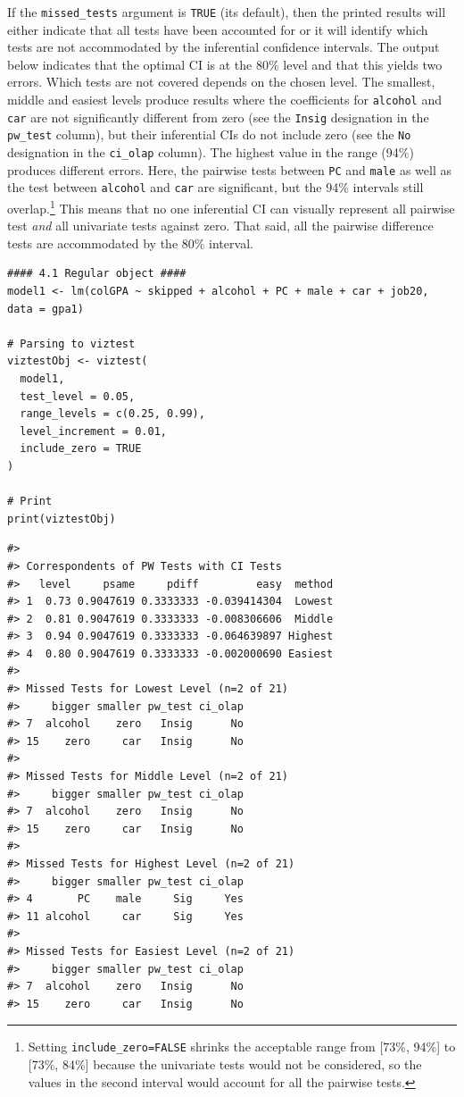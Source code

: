 If the \texttt{missed\_tests} argument is \texttt{TRUE} (its default), then the printed results will either indicate that all tests have been accounted for or it will identify which tests are not accommodated by the inferential confidence intervals. The output below indicates that the optimal CI is at the \(80\%\) level and that this yields two errors. Which tests are not covered depends on the chosen level. The smallest, middle and easiest levels produce results where the coefficients for \texttt{alcohol} and \texttt{car} are not significantly different from zero (see the \texttt{Insig} designation in the \texttt{pw\_test} column), but their inferential CIs do not include zero (see the \texttt{No} designation in the \texttt{ci\_olap} column). The highest value in the range (94\%) produces different errors. Here, the pairwise tests between \texttt{PC} and \texttt{male} as well as the test between \texttt{alcohol} and \texttt{car} are significant, but the 94\% intervals still overlap.\footnote{Setting \texttt{include\_zero=FALSE} shrinks the acceptable range from {[}73\%, 94\%{]} to {[}73\%, 84\%{]} because the univariate tests would not be considered, so the values in the second interval would account for all the pairwise tests.} This means that no one inferential CI can visually represent all pairwise test \emph{and} all univariate tests against zero. That said, all the pairwise difference tests are accommodated by the 80\% interval.

\begin{verbatim}
#### 4.1 Regular object ####
model1 <- lm(colGPA ~ skipped + alcohol + PC + male + car + job20, data = gpa1)

# Parsing to viztest
viztestObj <- viztest(
  model1,
  test_level = 0.05,
  range_levels = c(0.25, 0.99),
  level_increment = 0.01,
  include_zero = TRUE
)

# Print
print(viztestObj)
\end{verbatim}

\begin{verbatim}
#> 
#> Correspondents of PW Tests with CI Tests
#>   level     psame     pdiff         easy  method
#> 1  0.73 0.9047619 0.3333333 -0.039414304  Lowest
#> 2  0.81 0.9047619 0.3333333 -0.008306606  Middle
#> 3  0.94 0.9047619 0.3333333 -0.064639897 Highest
#> 4  0.80 0.9047619 0.3333333 -0.002000690 Easiest
#> 
#> Missed Tests for Lowest Level (n=2 of 21)
#>     bigger smaller pw_test ci_olap
#> 7  alcohol    zero   Insig      No
#> 15    zero     car   Insig      No
#> 
#> Missed Tests for Middle Level (n=2 of 21)
#>     bigger smaller pw_test ci_olap
#> 7  alcohol    zero   Insig      No
#> 15    zero     car   Insig      No
#> 
#> Missed Tests for Highest Level (n=2 of 21)
#>     bigger smaller pw_test ci_olap
#> 4       PC    male     Sig     Yes
#> 11 alcohol     car     Sig     Yes
#> 
#> Missed Tests for Easiest Level (n=2 of 21)
#>     bigger smaller pw_test ci_olap
#> 7  alcohol    zero   Insig      No
#> 15    zero     car   Insig      No
\end{verbatim}

